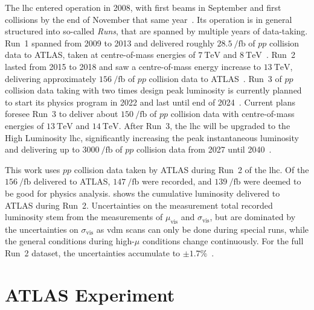 The \gls{lhc} entered operation in 2008, with first beams in September and first collisions by the end of November that same year~\cite{startup}. Its operation is in general structured into so-called \textit{Runs}, that are spanned by multiple years of data-taking. Run~1 spanned from 2009 to 2013 and delivered roughly $\SI{28.5}{\per\femto\barn}$ of $pp$ collision data to ATLAS, taken at centre-of-mass energies of $\SI{7}{\TeV}$ and $\SI{8}{\TeV}$~\cite{Aad:2011dr,Aad:1517411,Aaboud:2016hhf}. Run~2 lasted from 2015 to 2018 and saw a centre-of-mass energy increase to $\SI{13}{\TeV}$, delivering approximately $\SI{156}{\per\femto\barn}$ of $pp$ collision data to ATLAS~\cite{ATLAS-CONF-2019-021}. Run~3 of $pp$ collision data taking with two times design peak luminosity is currently planned to start its physics program in 2022 and last until end of 2024~\cite{run3}. Current plans foresee Run~3 to deliver about $\SI{150}{\per\femto\barn}$ of $pp$ collision data with centre-of-mass energies of $\SI{13}{\TeV}$ and $\SI{14}{\TeV}$. After Run~3, the \gls{lhc} will be upgraded to the High Luminosity \gls{lhc}, significantly increasing the peak instantaneous luminosity and delivering up to $\SI{3000}{\per\femto\barn}$ of $pp$ collision data from 2027 until 2040~\cite{run3,Apollinari:2284929}. 

This work uses $pp$ collision data taken by ATLAS during Run~2 of the \gls{lhc}. Of the $\SI{156}{\per\femto\barn}$ delivered to ATLAS, $\SI{147}{\per\femto\barn}$ were recorded, and $\SI{139}{\per\femto\barn}$ were deemed to be good for physics analysis.  shows the cumulative luminosity delivered to ATLAS during Run~2. Uncertainties on the measurement total recorded luminosity stem from the measurements of $\mu_\mathrm{vis}$ and $\sigma_\mathrm{vis}$, but are dominated by the uncertainties on $\sigma_\mathrm{vis}$ as \gls{vdm} scans can only be done during special runs, while the general conditions during high-$\mu$ conditions change continuously. For the full Run~2 dataset, the uncertainties accumulate to $\pm 1.7 \%$~\cite{ATLAS-CONF-2019-021}.

\section{ATLAS Experiment}\label{sec:atlas_experiment}

